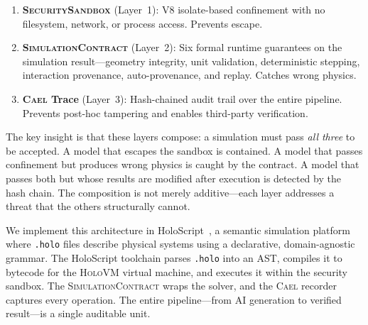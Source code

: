 \documentclass[letterpaper,twocolumn,10pt]{article}
\newcommand{\cael}{\textsc{Cael}}
\newcommand{\holoscript}{HoloScript}
\newcommand{\simcontract}{\textsc{SimulationContract}}
\newcommand{\sandbox}{\textsc{SecuritySandbox}} %
\newcommand{\holovm}{\textsc{HoloVM}}
\begin{document}
\begin{enumerate}[leftmargin=*,topsep=2pt,itemsep=1pt]
  \item \textbf{\sandbox{}} (Layer~1): V8 isolate-based confinement with
    no filesystem, network, or process access. Prevents escape.
  \item \textbf{\simcontract{}} (Layer~2): Six formal runtime guarantees
    on the simulation result---geometry integrity, unit validation,
    deterministic stepping, interaction provenance, auto-provenance,
    and replay. Catches wrong physics.
  \item \textbf{\cael{} Trace} (Layer~3): Hash-chained audit trail over
    the entire pipeline. Prevents post-hoc tampering and enables
    third-party verification.
\end{enumerate}

The key insight is that these layers compose: a simulation must pass
\emph{all three} to be accepted. A model that escapes the sandbox is
contained. A model that passes confinement but produces wrong physics
is caught by the contract. A model that passes both but whose results
are modified after execution is detected by the hash chain. The
composition is not merely additive---each layer addresses a threat
that the others structurally cannot.

We implement this architecture in \holoscript{}~\cite{holoscript2026},
a semantic simulation platform where \texttt{.holo} files describe
physical systems using a declarative, domain-agnostic grammar. The
\holoscript{} toolchain parses \texttt{.holo} into an AST, compiles it
to bytecode for the \holovm{} virtual machine, and executes it within
the security sandbox. The \simcontract{} wraps the solver, and the
\cael{} recorder captures every operation. The entire pipeline---from
AI generation to verified result---is a single auditable unit.
\end{document}
